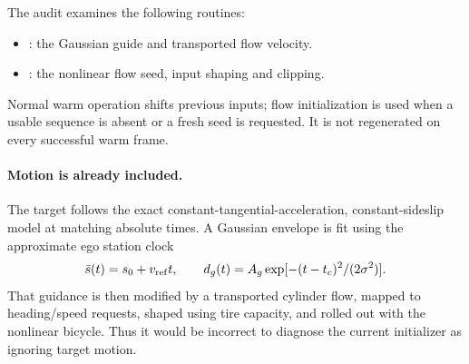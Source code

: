 \documentclass[10pt]{article}
\begin{document}
The audit examines the following routines:
\begin{itemize}
\item {}: the Gaussian guide
and transported flow velocity.
\item {}: the nonlinear flow seed,
input shaping and clipping.
\end{itemize}
Normal warm operation shifts previous inputs; flow initialization is used
when a usable sequence is absent or a fresh seed is requested. It is not
regenerated on every successful warm frame.

\paragraph{Motion is already included.}
The target follows the exact constant-tangential-acceleration,
constant-sideslip model at matching absolute times. A Gaussian envelope is fit
using the approximate ego station clock
\[
 \bar s(t)=s_0+v_{\rm ref}t,\qquad
 d_g(t)=A_g\exp[-(t-t_c)^2/(2\sigma^2)].
\]
That guidance is then modified by a transported cylinder flow, mapped to
heading/speed requests, shaped using tire capacity, and rolled out with the
nonlinear bicycle. Thus it would be incorrect to diagnose the current
initializer as ignoring target motion.
\end{document}
